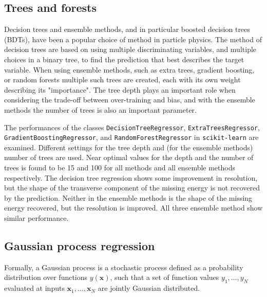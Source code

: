 \documentclass{scrartcl}
\begin{document}
\subsection{Trees and forests}

Decision trees and ensemble methods, and in particular boosted decision trees (BDTs), have been a popular choice of method in particle physics. The method of decision trees are based on using multiple discriminating variables, and multiple choices in a binary tree, to find the prediction that best describes the target variable. When using ensemble methods, such as extra trees, gradient boosting, or random forests multiple such trees are created, each with its own weight describing its "importance". The tree depth plays an important role when considering the trade-off between over-training and bias, and with the ensemble methods the number of trees is also an important parameter.

The performances of the classes \texttt{DecisionTreeRegressor}, \texttt{ExtraTreesRegressor}, \texttt{GradientBoostingRegressor}, and \texttt{RandomForestRegressor} in \texttt{scikit-learn} are examined. Different settings for the tree depth and (for the ensemble methods) number of trees are used. Near optimal values for the depth and the number of trees is found to be 15 and 100 for all methods and all ensemble methods respectively. The decision tree regression shows some improvement in resolution, but the shape of the transverse component of the missing energy is not recovered by the prediction. Neither in the ensemble methods is the shape of the missing energy recovered, but the resolution is improved. All three ensemble method show similar performance.

\subsection{Gaussian process regression}
Formally, a Gaussian process is a stochastic process defined as a probability distribution over functions $y(\mathbf x)$, such that a set of function values $y_1, \ldots, y_N$ evaluated at inputs $\mathbf x_1, \ldots, \mathbf x_N$ are jointly Gaussian distributed.
\end{document}
